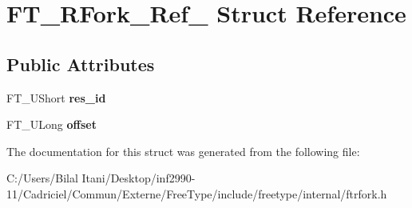 \hypertarget{struct_f_t___r_fork___ref__}{}\section{F\+T\+\_\+\+R\+Fork\+\_\+\+Ref\+\_\+ Struct Reference}
\label{struct_f_t___r_fork___ref__}
\subsection*{Public Attributes}
\begin{DoxyCompactItemize}
\item 
F\+T\+\_\+\+U\+Short {\bfseries res\+\_\+id}\hypertarget{struct_f_t___r_fork___ref___a7bca14bddf56df7903166b52e19a0500}{}\label{struct_f_t___r_fork___ref___a7bca14bddf56df7903166b52e19a0500}

\item 
F\+T\+\_\+\+U\+Long {\bfseries offset}\hypertarget{struct_f_t___r_fork___ref___af84c349a29b40c42a788927b113f9ecf}{}\label{struct_f_t___r_fork___ref___af84c349a29b40c42a788927b113f9ecf}

\end{DoxyCompactItemize}


The documentation for this struct was generated from the following file\+:\begin{DoxyCompactItemize}
\item 
C\+:/\+Users/\+Bilal Itani/\+Desktop/inf2990-\/11/\+Cadriciel/\+Commun/\+Externe/\+Free\+Type/include/freetype/internal/ftrfork.\+h\end{DoxyCompactItemize}
